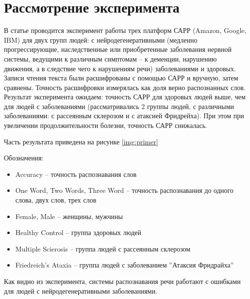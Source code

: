 \section{Рассмотрение эксперимента}
В статье \cite{primer} проводится эксперимент работы трех платформ САРР (Amazon, Google, IBM) для двух групп людей: с нейродегенеративными (медленно прогрессирующие, наследственные или приобретенные заболевания нервной системы, ведущими к различным симптомам -- к деменции, нарушению движения, а в следствие чего к нарушениям речи) заболеваниями и здоровых. Записи чтения текста были расшифрованы с помощью САРР и вручную, затем сравнены. Точность расшифровки измерялась как доля верно распознанных слов. Результат эксперимента ожидаем: точность САРР для здоровых людей выше, чем для людей с заболеваниями (рассматривались 2 группы людей, с различными заболеваниями: с рассеянным склерозом и с атаксией Фридрейха). При этом при увеличении продолжительности болезни, точность САРР снижалась. 

Часть результата приведена на рисунке \ref{img:primer}

Обозначения: 
\begin{itemize}
	\item Accuracy -- точность распознавания слов
	\item One Word, Two Words, Three Word -- точность распознавания до одного слова, двух слов, трех слов
	\item Female, Male -- женщины, мужчины
	\item Healthy Control -- группа здоровых людей
	\item Multiple Scierosis -- группа людей с рассеянным склерозом
	\item Friedreich's Ataxia -- группа людей с заболеванием ''Атаксия Фридрайха''
\end{itemize}

Как видно из эксперимента, системы распознавания речи работают с ошибками для людей с нейродегенеративными заболеваниями.
